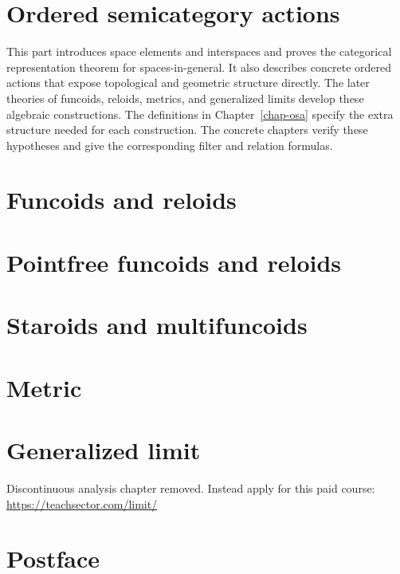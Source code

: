 \documentclass[a4paper,oneside,english,reqno]{amsbook}
\numberwithin{section}{chapter}
\begin{document}
\part{Ordered semicategory actions}

This part introduces space elements and interspaces and proves the
categorical representation theorem for spaces-in-general. It also
describes concrete ordered actions that expose topological and
geometric structure directly. The later theories of funcoids, reloids,
metrics, and generalized limits develop these algebraic constructions.
The definitions in Chapter~\ref{chap-osa} specify the extra structure
needed for each construction. The concrete chapters verify these
hypotheses and give the corresponding filter and relation formulas.



\part{Funcoids and reloids}














\part{Pointfree funcoids and reloids}



\part{Staroids and multifuncoids}



\part{Metric}


\part{Generalized limit}
Discontinuous analysis chapter removed.
Instead apply for this paid course:
\url{https://teachsector.com/limit/}

% 

\part{Postface}






\printindex{}




\addtocounter{figure}{-1}
\label{LASTFIGURE}
\end{document}
